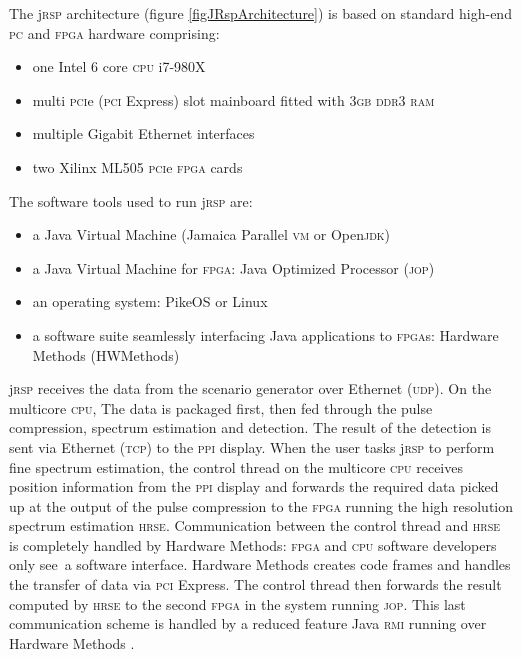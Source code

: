 \documentclass{sig-alternate}
\newcommand{\acronym}[1]{\textsc{#1}}
\begin{document}
The j\acronym{rsp} architecture (figure \ref{figJRspArchitecture}) 
is based on standard high-end \acronym{pc} and \acronym{fpga} hardware comprising:
\begin{itemize}
\item one Intel 6 core \acronym{cpu} i7-980X
\item multi \acronym{pci}e (\acronym{pci} Express) slot 
      mainboard fitted with \acronym{3gb ddr3 ram}
\item multiple Gigabit Ethernet interfaces
\item two Xilinx ML505 \acronym{pci}e \acronym{fpga} cards
\end{itemize}

The software tools used to run j\acronym{rsp} are:
\begin{itemize}
\item a Java Virtual Machine (Jamaica Parallel \acronym{vm} or Open\acronym{jdk})
\item a Java Virtual Machine for \acronym{fpga}: 
      Java Optimized Processor (\acronym{jop})
\item an operating system: PikeOS or Linux
\item a software suite seamlessly 
      interfacing Java applications to \acronym{fpga}s: 
      Hardware Methods (HWMethods)
\end{itemize}

j\acronym{rsp} receives the data from the scenario generator over Ethernet (\acronym{udp}).  On the multicore \acronym{cpu}, The data is packaged first, then fed through the pulse compression, spectrum estimation and detection. The result of the detection is sent via Ethernet (\acronym{tcp}) to the \acronym{ppi} display. When the user tasks j\acronym{rsp} to perform fine spectrum estimation, the control thread on the multicore \acronym{cpu} receives position information from the \acronym{ppi} display and forwards the required data picked up at the output of the pulse compression to the \acronym{fpga} running the high resolution spectrum estimation \acronym{hrse}. Communication between the control thread and \acronym{hrse} is completely handled by Hardware Methods: \acronym{fpga} and \acronym{cpu} software developers only \glqq see\grqq\ a software interface. Hardware Methods creates code frames and handles the transfer of data via \acronym{pci} Express. The control thread then forwards the result computed by \acronym{hrse} to the second \acronym{fpga} in the system running \acronym{jop}. This last communication scheme is handled by a reduced feature Java \acronym{rmi} running over Hardware Methods \cite{jRmiBachelor}. 
\end{document}
